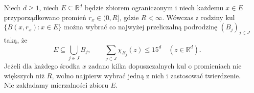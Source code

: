 \begin{twierdzenie}
\label{thm:besicovitch-24}
Niech $d\ge1$, niech $E\subseteq\mathbb R^d$ będzie
zbiorem ograniczonym i niech każdemu $x\in E$
przyporządkowano promień $r_x\in(0,R]$, gdzie
$R<\infty$. Wówczas z rodziny kul $\{B(x,r_x):x\in E\}$
można wybrać co najwyżej przeliczalną podrodzinę
$(B_j)_{j\in J}$ taką, że
\begin{equation}\label{eq:besicovitch-infinite-24}
 E\subseteq\bigcup_{j\in J}B_j,\qquad
 \sum_{j\in J}\chi_{B_j}(z)\le15^d
 \quad(z\in\mathbb R^d).
\end{equation}
Jeżeli dla każdego środka $x$ zadano kilka dopuszczalnych
kul o promieniach nie większych niż $R$, wolno najpierw
wybrać jedną z nich i zastosować twierdzenie.
Nie zakładamy mierzalności zbioru $E$.
\end{twierdzenie}
